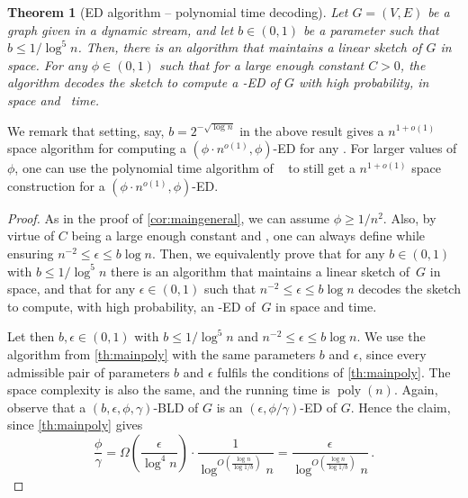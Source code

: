 \documentclass[epsfig,letter,11pt]{article}
\numberwithin{equation}{section}
\DeclareMathOperator*{\poly}{poly}
\newtheorem{mainthactual}{Theorem}
\begin{document}
\begin{mainthactual}[ED algorithm -- polynomial time decoding]
	\label{cor:mainpolygeneral}
	Let $G=(V, E)$ be a graph given in a dynamic stream, and let $b \in (0,1)$ be a parameter such that $b \le 1/\log^5 n$. Then, there is an algorithm that maintains a linear sketch of $G$ in  space. For any {$\phi \in (0,1)$} such that  for a large enough constant $C>0$, the algorithm decodes the sketch to compute a -ED of $G$  with high probability, in  space and~\smash{$\poly(n)$} time.
\end{mainthactual}
\noindent
We remark that setting, say, $b = 2^{-\sqrt{\log n}}$  in the above result gives a $n^{1+o(1)}$ space algorithm for computing a $(\phi \cdot n^{o(1)}, \phi)$-ED for any . For larger values of $\phi$, one can use the polynomial time algorithm of ~\cite{streamexpdec} to still get a $n^{1+o(1)}$ space construction for a  $(\phi \cdot n^{o(1)}, \phi)$-ED.
\begin{proof}
	As in the proof of \cref{cor:maingeneral}, we can assume $\phi \ge 1/n^2$. Also, by virtue of $C$ being a large enough constant and  , one can always define  while ensuring $n^{-2} \le \epsilon \le b \log n$. Then, we equivalently prove that for any $b \in (0,1)$ with $b \le 1/\log^5 n$ there is an algorithm that maintains a linear sketch of~$G$ in  space, and that for any $\epsilon \in (0,1)$ such that $n^{-2} \le \epsilon \le b \log n$ decodes the sketch to compute, with high probability, an -ED of~$G$ in  space and \smash{$\poly(n)$} time.
	
	Let then $b,\epsilon \in (0,1)$ with $b \le 1/\log^5 n$ and $n^{-2} \le \epsilon \le b \log n$. We use the algorithm from \cref{th:mainpoly} with the same parameters $b$ and $\epsilon$, since every admissible pair of parameters $b$ and $\epsilon$ fulfils the conditions of \cref{th:mainpoly}. The space complexity is also the same, and the running time is $\poly(n)$. Again, observe that a $(b, \epsilon, \phi, \gamma)$-BLD of $G$ is an $(\epsilon,\phi/\gamma)$-ED of $G$. Hence the claim, since \cref{th:mainpoly} gives
	\begin{equation*}
		\frac{\phi}{\gamma} = \Omega\left(\frac{\epsilon}{\log^4 n}\right) \cdot \frac{1}{\log^{O\left(\frac{\log n}{\log 1/b}\right)} n} = \frac{\epsilon}{\log^{O\left(\frac{\log n}{\log 1/b}\right)} n} \, .
	\end{equation*}
\end{proof}
\end{document}
